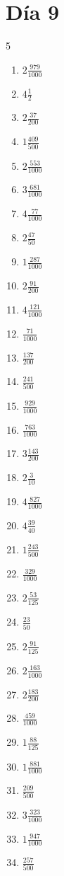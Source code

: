 \documentclass[12pt]{article}
\begin{document}
\section*{Día 9}
\begin{multicols}{5}\begin{enumerate}
		\item $ 2 \frac{979}{1000} $
		\item $ 4 \frac{1}{2} $
		\item $ 2 \frac{37}{200} $
		\item $ 1 \frac{409}{500} $
		\item $ 2 \frac{553}{1000} $
		\item $ 3 \frac{681}{1000} $
		\item $ 4 \frac{77}{1000} $
		\item $ 2 \frac{47}{50} $
		\item $ 1 \frac{287}{1000} $
		\item $ 2 \frac{91}{200} $
		\item $ 4 \frac{121}{1000} $
		\item $ \frac{71}{1000} $
		\item $ \frac{137}{200} $
		\item $ \frac{241}{500} $
		\item $ \frac{929}{1000} $
		\item $ \frac{763}{1000} $
		\item $ 3 \frac{143}{200} $
		\item $ 2 \frac{3}{10} $
		\item $ 4 \frac{827}{1000} $
		\item $ 4 \frac{39}{40} $
		\item $ 1 \frac{243}{500} $
		\item $ \frac{329}{1000} $
		\item $ 2 \frac{53}{125} $
		\item $ \frac{23}{50} $
		\item $ 2 \frac{91}{125} $
		\item $ 2 \frac{163}{1000} $
		\item $ 2 \frac{183}{200} $
		\item $ \frac{459}{1000} $
		\item $ 1 \frac{88}{125} $
		\item $ 1 \frac{881}{1000} $
		\item $ \frac{209}{500} $
		\item $ 3 \frac{323}{1000} $
		\item $ 1 \frac{947}{1000} $
		\item $ \frac{257}{500} $

\end{enumerate}
\end{multicols}
\end{document}

